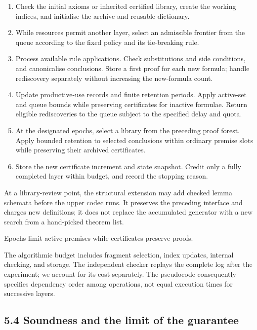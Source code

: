 \documentclass[pdflatex,sn-basic,Numbered]{sn-jnl}
\newcommand{\tightlist}{\setlength{\itemsep}{0pt}\setlength{\parskip}{0pt}}
\begin{document}
\begin{enumerate}
\def\labelenumi{\arabic{enumi}.}
\tightlist
\item
  Check the initial axioms or inherited certified library, create the working indices, and initialise the archive and reusable dictionary.
\item
  While resources permit another layer, select an admissible frontier from the queue according to the fixed policy and its tie-breaking rule.
\item
  Process available rule applications. Check substitutions and side conditions, and canonicalise conclusions. Store a first proof for each new formula; handle rediscovery separately without increasing the new-formula count.
\item
  Update productive-use records and finite retention periods. Apply active-set and queue bounds while preserving certificates for inactive formulae. Return eligible rediscoveries to the queue subject to the specified delay and quota.
\item
  At the designated epochs, select a library from the preceding proof forest. Apply bounded retention to selected conclusions within ordinary premise slots while preserving their archived certificates.
\item
  Store the new certificate increment and state snapshot. Credit only a fully completed layer within budget, and record the stopping reason.
\end{enumerate}

At a library-review point, the structural extension may add checked lemma schemata before the upper codec runs. It preserves the preceding interface and charges new definitions; it does not replace the accumulated generator with a new search from a hand-picked theorem list. 

Epochs limit active premises while certificates preserve proofs.

The algorithmic budget includes fragment selection, index updates, internal checking, and storage. The independent checker replays the complete log after the experiment; we account for its cost separately. The pseudocode consequently specifies dependency order among operations, not equal execution times for successive layers.

\subsection*{5.4 Soundness and the limit of the guarantee}\label{soundness-and-the-limit-of-the-guarantee}
\end{document}
